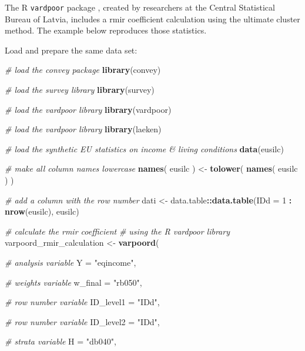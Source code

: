 \documentclass[]{book}
\newenvironment{Shaded}{\begin{snugshade}}{\end{snugshade}}
\newcommand{\CommentTok}[1]{\textcolor[rgb]{0.56,0.35,0.01}{\textit{#1}}}
\newcommand{\DataTypeTok}[1]{\textcolor[rgb]{0.13,0.29,0.53}{#1}}
\newcommand{\DecValTok}[1]{\textcolor[rgb]{0.00,0.00,0.81}{#1}}
\newcommand{\KeywordTok}[1]{\textcolor[rgb]{0.13,0.29,0.53}{\textbf{#1}}}
\newcommand{\NormalTok}[1]{#1}
\newcommand{\OperatorTok}[1]{\textcolor[rgb]{0.81,0.36,0.00}{\textbf{#1}}}
\newcommand{\StringTok}[1]{\textcolor[rgb]{0.31,0.60,0.02}{#1}}
\begin{document}
The R \texttt{vardpoor} package \citep{vardpoor}, created by researchers at the Central Statistical Bureau of Latvia, includes a rmir coefficient calculation using the ultimate cluster method. The example below reproduces those statistics.

Load and prepare the same data set:

\begin{Shaded}
\begin{Highlighting}[]
\CommentTok{# load the convey package}
\KeywordTok{library}\NormalTok{(convey)}

\CommentTok{# load the survey library}
\KeywordTok{library}\NormalTok{(survey)}

\CommentTok{# load the vardpoor library}
\KeywordTok{library}\NormalTok{(vardpoor)}

\CommentTok{# load the vardpoor library}
\KeywordTok{library}\NormalTok{(laeken)}

\CommentTok{# load the synthetic EU statistics on income & living conditions}
\KeywordTok{data}\NormalTok{(eusilc)}

\CommentTok{# make all column names lowercase}
\KeywordTok{names}\NormalTok{( eusilc ) <-}\StringTok{ }\KeywordTok{tolower}\NormalTok{( }\KeywordTok{names}\NormalTok{( eusilc ) )}

\CommentTok{# add a column with the row number}
\NormalTok{dati <-}\StringTok{ }\NormalTok{data.table}\OperatorTok{::}\KeywordTok{data.table}\NormalTok{(}\DataTypeTok{IDd =} \DecValTok{1} \OperatorTok{:}\StringTok{ }\KeywordTok{nrow}\NormalTok{(eusilc), eusilc)}

\CommentTok{# calculate the rmir coefficient}
\CommentTok{# using the R vardpoor library}
\NormalTok{varpoord_rmir_calculation <-}
\StringTok{    }\KeywordTok{varpoord}\NormalTok{(}
    
        \CommentTok{# analysis variable}
        \DataTypeTok{Y =} \StringTok{"eqincome"}\NormalTok{, }
        
        \CommentTok{# weights variable}
        \DataTypeTok{w_final =} \StringTok{"rb050"}\NormalTok{,}
        
        \CommentTok{# row number variable}
        \DataTypeTok{ID_level1 =} \StringTok{"IDd"}\NormalTok{,}
        
        \CommentTok{# row number variable}
        \DataTypeTok{ID_level2 =} \StringTok{"IDd"}\NormalTok{,}
        
        \CommentTok{# strata variable}
        \DataTypeTok{H =} \StringTok{"db040"}\NormalTok{, }
        

\end{Highlighting}
\end{Shaded}
\end{document}
